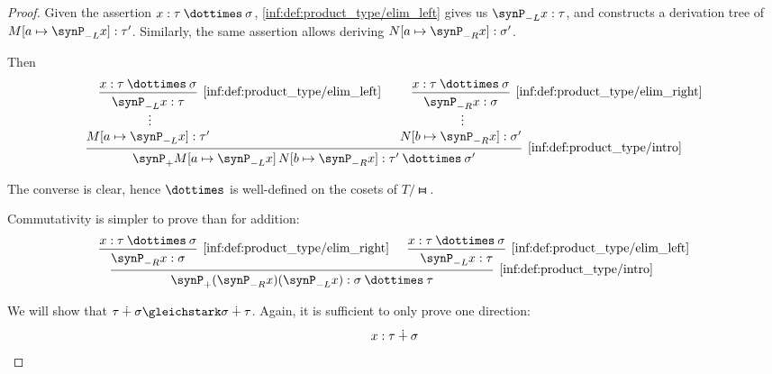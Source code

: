 \begin{proof}
  Given the assertion \( x: \tau \syntimes \sigma \), \ref{inf:def:product_type/elim_left} gives us \( \synP_{-L} x: \tau \), and  constructs a derivation tree of \( M[a \mapsto \synP_{-L} x]: \tau' \). Similarly, the same assertion allows deriving \( N[a \mapsto \synP_{-R} x]: \sigma' \).

  Then
  \begin{equation*}
    \begin{prooftree}
      \hypo{ x: \tau \syntimes \sigma }
      \infer1[\ref{inf:def:product_type/elim_left}]{ \synP_{-L} x: \tau }

      \ellipsis {} { M[a \mapsto \synP_{-L} x]: \tau' }

      \hypo{ x: \tau \syntimes \sigma }
      \infer1[\ref{inf:def:product_type/elim_right}]{ \synP_{-R} x: \sigma }

      \ellipsis {} { N[b \mapsto \synP_{-R} x]: \sigma' }

      \infer2[\ref{inf:def:product_type/intro}]{ \synP_+ M[a \mapsto \synP_{-L} x] \thinspace N[b \mapsto \synP_{-R} x]: \tau' \syntimes \sigma' }
    \end{prooftree}
  \end{equation*}

  The converse is clear, hence \( {\syntimes} \) is well-defined on the cosets of \( T / {\gleichstark} \).

   Commutativity is simpler to prove than for addition:
  \begin{equation*}
    \begin{prooftree}
      \hypo{ x: \tau \syntimes \sigma }
      \infer1[\ref{inf:def:product_type/elim_right}]{ \synP_{-R} x: \sigma }

      \hypo{ x: \tau \syntimes \sigma }
      \infer1[\ref{inf:def:product_type/elim_left}]{ \synP_{-L} x: \tau }

      \infer2[\ref{inf:def:product_type/intro}]{ \synP_+ (\synP_{-R} x) (\synP_{-L} x): \sigma \syntimes \tau }
    \end{prooftree}
  \end{equation*}

   We will show that \( \tau \synplus \sigma \gleichstark \sigma \synplus \tau \). Again, it is sufficient to only prove one direction:
  \begin{equation*}
    \begin{prooftree}
      \hypo{ x: \tau \synplus \sigma }


\end{prooftree}
\end{equation*}
\end{proof}
